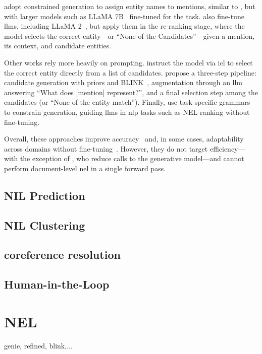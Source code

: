 \textcite{xiao-etal-2023-instructed} adopt constrained generation to assign entity names to mentions, similar to \cite{decao2021autoregressive}, but with larger models such as LLaMA 7B~\cite{touvron2023llamaopenefficientfoundation} fine-tuned for the task. \textcite{zhou-etal-2024-gendecider} also fine-tune \acp{llm}, including LLaMA 2~\cite{touvron2023llama2openfoundation}, but apply them in the re-ranking stage, where the model selects the correct entity---or ``None of the Candidates''---given a mention, its context, and candidate entities.

Other works rely more heavily on prompting. \textcite{liu-etal-2024-onenet} instruct the model via \ac{icl} to select the correct entity directly from a list of candidates. \textcite{ding-etal-2024-chatel} propose a three-step pipeline: candidate generation with priors and BLINK~\cite{blink}, augmentation through an \ac{llm} answering ``What does [mention] represent?'', and a final selection step among the candidates (or ``None of the entity match''). Finally, \textcite{geng-etal-2023-grammar} use task-specific grammars to constrain generation, guiding \acp{llm} in \ac{nlp} tasks such as NEL ranking without fine-tuning.

Overall, these approaches improve accuracy~\cite{liu-etal-2024-onenet,ding-etal-2024-chatel,zhou-etal-2024-gendecider,xiao-etal-2023-instructed} and, in some cases, adaptability across domains without fine-tuning~\cite{ding-etal-2024-chatel,zhou-etal-2024-gendecider,xiao-etal-2023-instructed}. However, they do not target efficiency---with the exception of \textcite{xiao-etal-2023-instructed}, who reduce calls to the generative model---and cannot perform document-level \ac{nel} in a single forward pass.









\subsection{NIL Prediction}
\subsection{NIL Clustering}
\subsection{coreference resolution}
\subsection{Human-in-the-Loop}


\section{NEL}
genie, refined, blink,...

